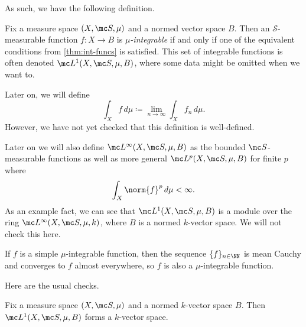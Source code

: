 \documentclass[../notes.tex]{subfiles}
\begin{document}
As such, we have the following definition.
\begin{definition}[Integrable]
	Fix a measure space $(X,\mc S,\mu)$ and a normed vector space $B$. Then an $\mathcal S$-measurable function $f\colon X\to B$ is \textit{$\mu$-integrable} if and only if one of the equivalent conditions from \autoref{thm:int-funcs} is satisfied. This set of integrable functions is often denoted $\mc L^1(X,\mc S,\mu,B)$, where some data might be omitted when we want to.
\end{definition}
\begin{remark}
	Later on, we will define
	\[\int_X f\,d\mu\coloneqq\lim_{n\to\infty}\int_Xf_n\,d\mu.\]
	However, we have not yet checked that this definition is well-defined.
\end{remark}
\begin{remark}
	Later on we will also define $\mc L^\infty(X,\mc S,\mu,B)$ as the bounded $\mc S$-measurable functions as well as more general $\mc L^p(X,\mc S,\mu,B)$ for finite $p$ where
	\[\int_X\norm{f}^p\,d\mu<\infty.\]
	As an example fact, we can see that $\mc L^1(X,\mc S,\mu,B)$ is a module over the ring $\mc L^\infty(X,\mc S,\mu,k)$, where $B$ is a normed $k$-vector space. We will not check this here.
\end{remark}
\begin{example} \label{ex:simple-int-is-int}
	If $f$ is a simple $\mu$-integrable function, then the sequence $\{f\}_{n\in\NN}$ is mean Cauchy and converges to $f$ almost everywhere, so $f$ is also a $\mu$-integrable function.
\end{example}
Here are the usual checks.
\begin{lemma} \label{lem:int-is-vec-space}
	Fix a measure space $(X,\mc S,\mu)$ and a normed $k$-vector space $B$. Then $\mc L^1(X,\mc S,\mu,B)$ forms a $k$-vector space.
\end{lemma}
\end{document}

